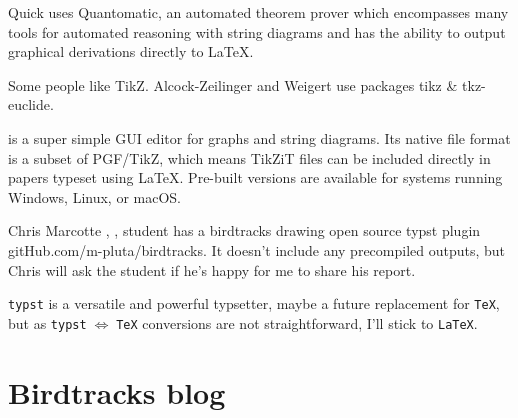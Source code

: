 \begin{description}
Quick  uses 
{Quantomatic}, an automated theorem prover which  encompasses many tools for
automated reasoning with string diagrams and has the ability to output
graphical derivations directly to LaTeX.

Some people like  {TikZ}.
Alcock-Zeilinger and Weigert use packages {tikz} \& {tkz-euclide}.

\item[2020-04-01 Predrag]
 is a super simple GUI editor for
graphs and string diagrams. Its native file format is a subset of
PGF/TikZ, which means TikZiT files can be included directly in papers
typeset using LaTeX. Pre-built versions are available for systems running
Windows, Linux, or macOS.

\item[2026-05-29 Predrag]
{Chris Marcotte} , ,  student has a birdtracks drawing  open source  {typst} plugin  {gitHub.com/m-pluta/birdtracks}. It doesn’t include any precompiled outputs, but Chris will ask the student if he’s happy for me to share his report.

\texttt{typst} is a versatile and powerful typsetter, maybe a future replacement for \texttt{TeX}, 
but as \texttt{typst}$\;\Longleftrightarrow\;$\texttt{TeX} conversions are not straightforward, 
I'll stick to \texttt{LaTeX}.


\end{description}

\section{Birdtracks blog}
\label{s-birdtrBlog}

